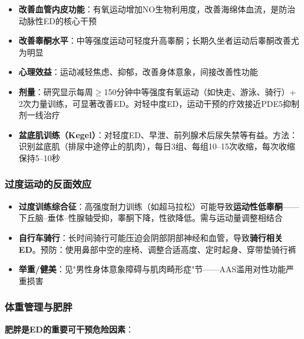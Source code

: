 \documentclass[12pt,a4paper,twoside]{ctexbook}
\begin{document}
\begin{itemize}[leftmargin=2cm]
	\item \textbf{改善血管内皮功能}：有氧运动增加NO生物利用度，改善海绵体血流，是防治动脉性ED的核心干预
	\item \textbf{改善睾酮水平}：中等强度运动可轻度升高睾酮；长期久坐者运动后睾酮改善尤为明显
	\item \textbf{心理效益}：运动减轻焦虑、抑郁，改善身体意象，间接改善性功能
	\item \textbf{剂量}：研究显示每周$\ge$150分钟中等强度有氧运动（如快走、游泳、骑行）+ 2次力量训练，可显著改善ED。对轻中度ED，运动干预的疗效接近PDE5抑制剂一线治疗
	\item \textbf{盆底肌训练（Kegel）}：对轻度ED、早泄、前列腺术后尿失禁等有益。方法：识别盆底肌（排尿中途停止的肌肉），每日3组、每组10--15次收缩，每次收缩保持5--10秒
\end{itemize}

\subsubsection{过度运动的反面效应}

\begin{itemize}[leftmargin=2cm]
	\item \textbf{过度训练综合征}：高强度耐力训练（如超马拉松）可能导致\textbf{运动性低睾酮}——下丘脑--垂体--性腺轴受抑，睾酮下降，性欲降低。需与运动量调整相结合
	\item \textbf{自行车骑行}：长时间骑行可能压迫会阴部阴部神经和血管，导致\textbf{骑行相关ED}。预防：使用鼻部中空的座椅、调整合适高度、定时起身、穿带垫骑行裤
	\item \textbf{举重/健美}：见"男性身体意象障碍与肌肉畸形症"节——AAS滥用对性功能严重损害
\end{itemize}

\subsubsection{体重管理与肥胖}

\textbf{肥胖是ED的重要可干预危险因素}：
\end{document}
